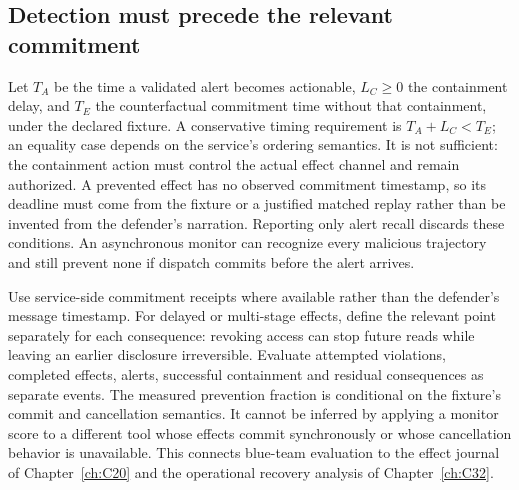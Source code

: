 \subsection{Detection must precede the relevant commitment}\label{sec:C28:precommitalert}
Let $T_A$ be the time a validated alert becomes actionable, $L_C\geq0$ the containment delay, and $T_E$ the counterfactual commitment time without that containment, under the declared fixture. A conservative timing requirement is $T_A+L_C<T_E$; an equality case depends on the service's ordering semantics. It is not sufficient: the containment action must control the actual effect channel and remain authorized. A prevented effect has no observed commitment timestamp, so its deadline must come from the fixture or a justified matched replay rather than be invented from the defender's narration. Reporting only alert recall discards these conditions. An asynchronous monitor can recognize every malicious trajectory and still prevent none if dispatch commits before the alert arrives.

Use service-side commitment receipts where available rather than the defender's message timestamp. For delayed or multi-stage effects, define the relevant point separately for each consequence: revoking access can stop future reads while leaving an earlier disclosure irreversible. Evaluate attempted violations, completed effects, alerts, successful containment and residual consequences as separate events. The measured prevention fraction is conditional on the fixture's commit and cancellation semantics. It cannot be inferred by applying a monitor score to a different tool whose effects commit synchronously or whose cancellation behavior is unavailable. This connects blue-team evaluation to the effect journal of Chapter~\ref{ch:C20} and the operational recovery analysis of Chapter~\ref{ch:C32}.
